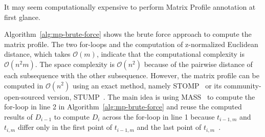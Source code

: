 It may seem computationally expensive to perform Matrix Profile annotation at first glance.
%

Algorithm~\ref{alg:mp-brute-force} shows the brute force approach to compute the matrix profile.
The two for-loops and the computation of z-normalized Euclidean distance, which takes $\mathcal{O}(m)$, indicate that the computational complexity is $\mathcal{O}(n^2m)$.
The space complexity is $\mathcal{O}(n^2)$ because of the pairwise distance of each subsequence with the other subsequence.
%
However, the matrix profile can be computed in $\mathcal{O}(n^2)$ using an exact method, namely STOMP~\cite{yeh2016matrix} or its community-open-sourced version, STUMP~\cite{law2019stumpy}.
The main idea is using MASS~\cite{zhong2024mass} to compute the for-loop in line 2 in Algorithm~\ref{alg:mp-brute-force} and reuse the computed results of $D_{i-1}$ to compute $D_i$ across the for-loop in line 1 because $t_{i-1, m}$ and $t_{i, m}$ differ only in the first point of $t_{i-1, m}$ and the last point of $t_{i, m}$~\cite{zhu2016matrix}.

